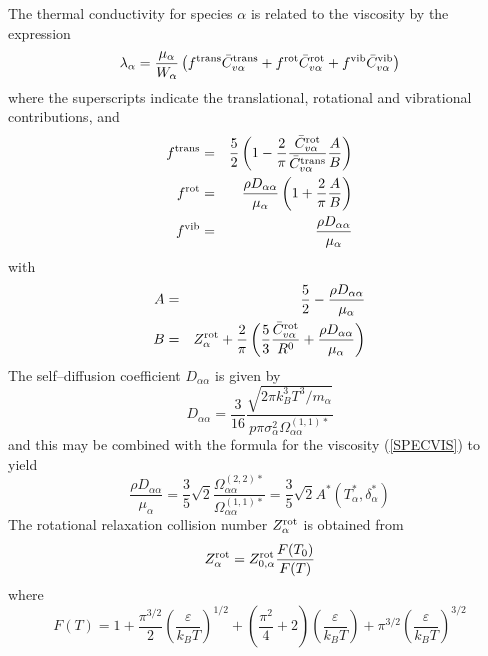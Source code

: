\documentclass[dvips]{article}
\begin{document}
\noindent
The thermal conductivity for species $\alpha$ is related to the
viscosity by the expression \cite{WarnatzConduc}
\begin{equation}
\lambda_{\alpha} = \frac{\mu_{\alpha}}{W_{\alpha}}
\left(
 f^{\rm trans}\bar{C}_{v\alpha}^{\rm trans}
+f^{\rm rot}\bar{C}_{v\alpha}^{\rm rot}
+f^{\rm vib}\bar{C}_{v\alpha}^{\rm vib}
\right)
\label{SPECOND}
\end{equation}
where the superscripts indicate the translational, rotational and
vibrational contributions, and
\begin{eqnarray}
f^{\rm trans} & = & \frac{5}{2}
\left(1-\frac{2}{\pi}\frac{\bar{C}_{v\alpha}^{\rm rot}}
{\bar{C}_{v\alpha}^{\rm trans}}
\frac{A}{B}\right) \nonumber\\
f^{\rm rot} & = & \frac{\rho D_{\alpha\alpha}}{\mu_{\alpha}}
\left(1+\frac{2}{\pi}\frac{A}{B}\right) \nonumber\\
f^{\rm vib} & = & \frac{\rho D_{\alpha\alpha}}{\mu_{\alpha}}
\end{eqnarray}
with
\begin{eqnarray}
A & = & \frac{5}{2} - \frac{\rho D_{\alpha\alpha}}{\mu_{\alpha}}
\nonumber\\
B & = & Z_{\alpha}^{\rm rot}
+ \frac{2}{\pi}\left(\frac{5}{3}\frac{\bar{C}_{v\alpha}^{\rm rot}}{R^{0}}
+ \frac{\rho D_{\alpha\alpha}}{\mu_{\alpha}}\right)
\end{eqnarray}
The self--diffusion coefficient $D_{\alpha\alpha}$ is given by
\begin{equation}    
D_{\alpha\alpha} = \frac{3}{16}\frac{\sqrt{2\pi k_{B}^{3}T^{3}/m_{\alpha}}}
{p\pi\sigma_{\alpha}^{2}\Omega_{\alpha\alpha}^{(1,1)*}}
\label{SELFDIF}
\end{equation}
and this may be combined with the formula for the viscosity (\ref{SPECVIS})
to yield
\begin{equation}
\frac{\rho D_{\alpha\alpha}}{\mu_{\alpha}} = \frac{3}{5}\sqrt{2}
\frac{\Omega_{\alpha\alpha}^{(2,2)*}}{\Omega_{\alpha\alpha}^{(1,1)*}}
= \frac{3}{5}\sqrt{2}A^{*}(T_{\alpha}^{*},\delta_{\alpha}^{*})
\end{equation}
The rotational relaxation collision number $Z_{\alpha}^{\rm rot}$ is
obtained from \cite{BrauJonkman}
\begin{equation}
Z_{\alpha}^{\rm rot} = Z_{0,\alpha}^{\rm rot}\frac{F(T_{0})}{F(T)}
\end{equation}
where
\begin{equation}
F(T) = 1 + \frac{\pi^{3/2}}{2}\left(\frac{\varepsilon}{k_{B}T}\right)^{1/2}
+ \left(\frac{\pi^{2}}{4}+2\right)\left(\frac{\varepsilon}{k_{B}T}\right)
+ \pi^{3/2}\left(\frac{\varepsilon}{k_{B}T}\right)^{3/2}
\end{equation}
\end{document}
